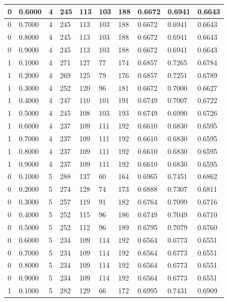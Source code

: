 \documentclass[12pt]{article}
\begin{document}
\begin{table}
{\begin{tabular}{| l | l | l | l | l | l | l | l | l | l |}
			0 & 0.6000 & 4 & 245 & 113 & 103 & 188 & 0.6672 & 0.6941 & 0.6643\\ \hline
			0 & 0.7000 & 4 & 245 & 113 & 103 & 188 & 0.6672 & 0.6941 & 0.6643\\ \hline
			0 & 0.8000 & 4 & 245 & 113 & 103 & 188 & 0.6672 & 0.6941 & 0.6643\\ \hline
			0 & 0.9000 & 4 & 245 & 113 & 103 & 188 & 0.6672 & 0.6941 & 0.6643\\ \hline
			1 & 0.1000 & 4 & 271 & 127 & 77 & 174 & 0.6857 & 0.7265 & 0.6784\\ \hline
			1 & 0.2000 & 4 & 269 & 125 & 79 & 176 & 0.6857 & 0.7251 & 0.6789\\ \hline
			1 & 0.3000 & 4 & 252 & 120 & 96 & 181 & 0.6672 & 0.7000 & 0.6627\\ \hline
			1 & 0.4000 & 4 & 247 & 110 & 101 & 191 & 0.6749 & 0.7007 & 0.6722\\ \hline
			1 & 0.5000 & 4 & 245 & 108 & 103 & 193 & 0.6749 & 0.6990 & 0.6726\\ \hline
			1 & 0.6000 & 4 & 237 & 109 & 111 & 192 & 0.6610 & 0.6830 & 0.6595\\ \hline
			1 & 0.7000 & 4 & 237 & 109 & 111 & 192 & 0.6610 & 0.6830 & 0.6595\\ \hline
			1 & 0.8000 & 4 & 237 & 109 & 111 & 192 & 0.6610 & 0.6830 & 0.6595\\ \hline
			1 & 0.9000 & 4 & 237 & 109 & 111 & 192 & 0.6610 & 0.6830 & 0.6595\\ \hline
			0 & 0.1000 & 5 & 288 & 137 & 60 & 164 & 0.6965 & 0.7451 & 0.6862\\ \hline
			0 & 0.2000 & 5 & 274 & 128 & 74 & 173 & 0.6888 & 0.7307 & 0.6811\\ \hline
			0 & 0.3000 & 5 & 257 & 119 & 91 & 182 & 0.6764 & 0.7099 & 0.6716\\ \hline
			0 & 0.4000 & 5 & 252 & 115 & 96 & 186 & 0.6749 & 0.7049 & 0.6710\\ \hline
			0 & 0.5000 & 5 & 252 & 112 & 96 & 189 & 0.6795 & 0.7079 & 0.6760\\ \hline
			0 & 0.6000 & 5 & 234 & 109 & 114 & 192 & 0.6564 & 0.6773 & 0.6551\\ \hline
			0 & 0.7000 & 5 & 234 & 109 & 114 & 192 & 0.6564 & 0.6773 & 0.6551\\ \hline
			0 & 0.8000 & 5 & 234 & 109 & 114 & 192 & 0.6564 & 0.6773 & 0.6551\\ \hline
			0 & 0.9000 & 5 & 234 & 109 & 114 & 192 & 0.6564 & 0.6773 & 0.6551\\ \hline
			1 & 0.1000 & 5 & 282 & 129 & 66 & 172 & 0.6995 & 0.7431 & 0.6909\\ \hline

\end{tabular}}
\end{table}
\end{document}
